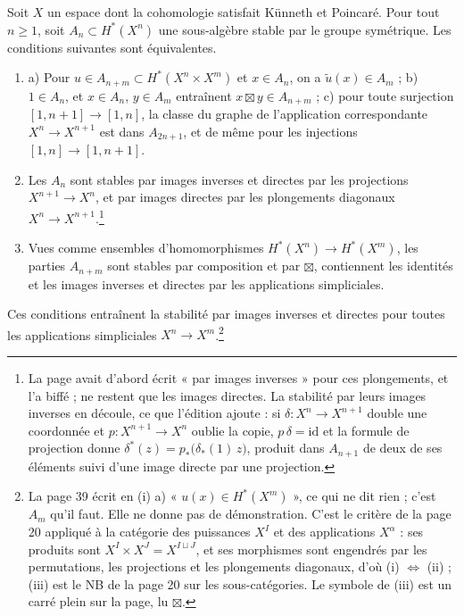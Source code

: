 \documentclass[11pt,a4paper]{article}
\begin{document}
Soit $X$ un espace dont la cohomologie satisfait Künneth et Poincaré. Pour
tout $n \geq 1$, soit $A_{n} \subset H^{*}(X^{n})$ une sous-algèbre stable par
le groupe symétrique. Les conditions suivantes sont équivalentes.

\begin{enumerate}
  \item[(i)] a) Pour $u \in A_{n+m} \subset H^{*}(X^{n} \times X^{m})$ et
  $x \in A_{n}$, on a $\tilde{u}(x) \in A_{m}$ ; b) $1 \in A_{n}$, et
  $x \in A_{n}$, $y \in A_{m}$ entraînent $x \boxtimes y \in A_{n+m}$ ; c) pour
  toute surjection $[1, n+1] \to [1, n]$, la classe du graphe de l'application
  correspondante $X^{n} \to X^{n+1}$ est dans $A_{2n+1}$, et de même pour les
  injections $[1, n] \to [1, n+1]$.
  \item[(ii)] Les $A_{n}$ sont stables par images inverses et directes par les
  projections $X^{n+1} \to X^{n}$, et par images directes par les plongements
  diagonaux $X^{n} \to X^{n+1}$.\footnote{La page avait d'abord écrit « par
  images inverses » pour ces plongements, et l'a biffé ; ne restent que les
  images directes. La stabilité par leurs images inverses en découle, ce que
  l'édition ajoute : si $\delta \colon X^{n} \to X^{n+1}$ double une
  coordonnée et $p \colon X^{n+1} \to X^{n}$ oublie la copie, $p\,\delta =
  \mathrm{id}$ et la formule de projection donne
  $\delta^{*}(z) = p_{*}\bigl(\delta_{*}(1)\, z\bigr)$, produit dans
  $A_{n+1}$ de deux de ses éléments suivi d'une image directe par une
  projection.}
  \item[(iii)] Vues comme ensembles d'homomorphismes $H^{*}(X^{n}) \to H^{*}(X^{m})$,
  les parties $A_{n+m}$ sont stables par composition et par $\boxtimes$,
  contiennent les identités et les images inverses et directes par les
  applications simpliciales.
\end{enumerate}

Ces conditions entraînent la stabilité par images inverses et directes pour
toutes les applications simpliciales $X^{n} \to X^{m}$.\footnote{La page 39
écrit en (i) a) « $u(x) \in H^{*}(X^{m})$ », ce qui ne dit rien ; c'est
$A_{m}$ qu'il faut. Elle ne donne pas de démonstration. C'est le critère de la
page 20 appliqué à la catégorie des puissances $X^{I}$ et des applications
$X^{\alpha}$ : ses produits sont $X^{I} \times X^{J} = X^{I \sqcup J}$, et
ses morphismes sont engendrés par les permutations, les projections et les
plongements diagonaux, d'où (i) $\Leftrightarrow$ (ii) ; (iii) est le NB de la
page 20 sur les sous-catégories. Le symbole de (iii) est un carré plein sur la
page, lu $\boxtimes$.}
\end{document}
